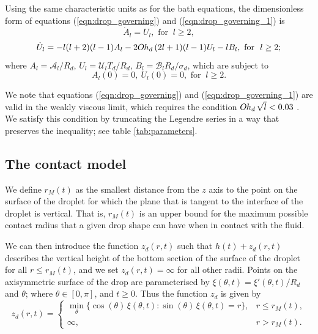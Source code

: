 \documentclass{jfm}
\newcommand{\Ohd}{O\kern-0.04em h_d\,}
\begin{document}
Using the same characteristic units as for the bath equations, the dimensionless form of equations (\ref{eqn:drop_governing}) and (\ref{eqn:drop_governing_1}) is
\begin{equation}
    \label{eqn:drop_governing_adim}
    \dot{A}_l = U_l, \text{ for } \ l \geq 2,
\end{equation}
\begin{equation}
    \label{eqn:drop_governing_adim_1}
    \dot{U}_l = - l(l+2)(l-1) A_l-2\Ohd (2l+1)(l-1)U_l-lB_l , \text{ for } \ l \geq 2;
\end{equation}
where $A_l = \mathcal{A}_l/R_d$, $U_l=\mathcal{U}_lT_d/R_d$,  $B_l = \mathcal{B}_l R_d/ \sigma_d$, which are subject to
\begin{equation}
    A_l(0) = 0,\ U_l(0) = 0, \text{ for } \ l \geq 2.
\end{equation}

    
We note that equations (\ref{eqn:drop_governing})  and (\ref{eqn:drop_governing_1}) are valid in the weakly viscous limit, which requires the condition $\Ohd \sqrt{l} < 0.03$ \citep{MolacekBush2012}. We satisfy this condition by truncating the Legendre series in a way that preserves the inequality; see table \ref{tab:parameters}.


\subsection{The contact model}
We define $r_M(t)$ as the smallest distance from the $z$ axis to the point on the surface of the droplet for which the plane that is tangent to the interface of the droplet is vertical. That is, $r_M(t)$ is an upper bound for the maximum possible contact radius that a given drop shape can have when in contact with the fluid. 

We can then introduce the function $z_d(r, t)$ such that $h(t) + z_d(r, t)$ describes the vertical height of the bottom section of the surface of the droplet for all $r\leq r_{M}(t)$, and we set  $z_d(r, t) = \infty$ for all other radii. Points on the axisymmetric surface of the drop are parameterised by $\xi(\theta, t) = \xi'(\theta, t)/R_d$ and $\theta$; where $\theta \in [ 0, \pi]$, and $t\geq 0$. Thus the function $z_d$ is given by
\begin{equation}
z_d(r,t) = 
\begin{cases}
\displaystyle \min_{\theta}\bigl\{\cos(\theta)\,\xi(\theta,t)\colon \sin(\theta)\,\xi(\theta,t)=r\bigr\}, 
& r \le r_M(t), \\[1ex]
\infty, 
& r > r_M(t).
\end{cases}
    \label{eqn:sphere_height_definition}
\end{equation}
\end{document}
